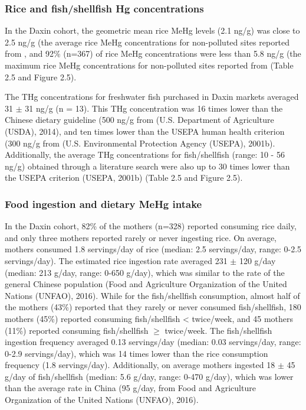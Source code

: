 \subsubsection{Rice and fish/shellfish Hg concentrations}

In the Daxin cohort, the geometric mean rice MeHg levels (2.1 ng/g) was close to 2.5 ng/g (the average rice MeHg concentrations for non-polluted sites reported from \cite{rothenberg2014rice}, and 92\% (n=367) of rice MeHg concentrations were less than 5.8 ng/g (the maximum rice MeHg concentrations for non-polluted sites reported from \cite{rothenberg2014rice} (Table 2.5 and Figure 2.5).

The THg concentrations for freshwater fish purchased in Daxin markets averaged 31 \({\pm}\) 31 ng/g (n = 13). This THg concentration was 16 times lower than the Chinese dietary guideline (500 ng/g from (U.S. Department of Agriculture (USDA), 2014), and ten times lower than the USEPA human health criterion (300 ng/g from (U.S. Environmental Protection Agency (USEPA), 2001b). Additionally, the average THg concentrations for fish/shellfish (range: 10 - 56 ng/g) obtained through a literature search were also up to 30 times lower than the USEPA criterion (USEPA, 2001b) (Table 2.5 and Figure 2.5). 

\subsubsection{Food ingestion and dietary MeHg intake}

In the Daxin cohort, 82\% of the mothers (n=328) reported consuming rice daily, and only three mothers reported rarely or never ingesting rice. On average, mothers consumed 1.8 servings/day of rice (median: 2.5 servings/day, range: 0-2.5 servings/day). The estimated rice ingestion rate averaged 231 \({\pm}\) 120 g/day (median: 213 g/day, range: 0-650 g/day), which was similar to the rate of the general Chinese population (Food and Agriculture Organization of the United Nations (UNFAO), 2016). While for the fish/shellfish consumption, almost half of the mothers (43\%) reported that they rarely or never consumed fish/shellfish, 180 mothers (45\%) reported consuming fish/shellfish < twice/week, and 45 mothers (11\%) reported consuming fish/shellfish ${\ge}$ twice/week. The fish/shellfish ingestion frequency averaged 0.13 servings/day (median: 0.03 servings/day, range: 0-2.9 servings/day), which was 14 times lower than the rice consumption frequency (1.8 servings/day). Additionally, on average mothers ingested 18 \({\pm}\) 45 g/day of fish/shellfish (median: 5.6 g/day, range: 0-470 g/day), which was lower than the average rate in China (95 g/day, from Food and Agriculture Organization of the United Nations (UNFAO), 2016). 

